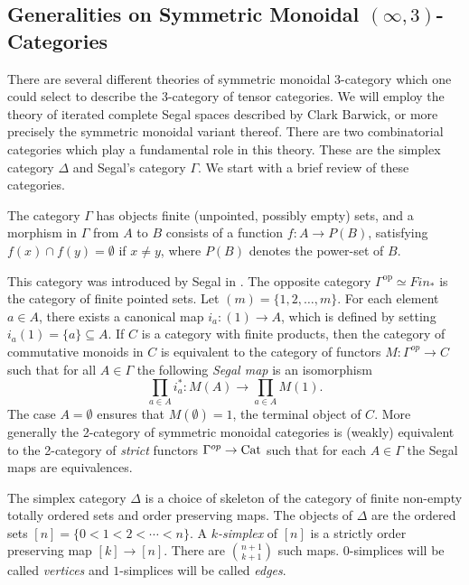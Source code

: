 \documentclass{amsart}
\begin{document}
\subsection{Generalities on Symmetric Monoidal $(\infty,3)$-Categories}

There are several different theories of symmetric monoidal 3-category which one could select to describe the 3-category of tensor categories. We will employ the theory of iterated complete Segal spaces described by Clark Barwick,  or more precisely the symmetric monoidal variant thereof. There are two combinatorial categories which play a fundamental role in this theory. These are the simplex category $\Delta$ and Segal's category $\Gamma$. We start with a brief review of these categories. 

\begin{definition}
	The category  $\Gamma$ has objects finite (unpointed, possibly empty) sets, and a morphism in $\Gamma$ from $A$ to $B$ consists of a function $f: A \to P(B)$, satisfying $f(x) \cap f(y) = \emptyset$ if $x \neq y$, where $P(B)$ denotes the power-set of $B$. 
\end{definition}

This category was introduced by Segal in \cite{Segal-Categories and Cohomology Theories}.  The opposite category $\Gamma^\textrm{op} \simeq Fin_*$ is the category of finite pointed sets. Let $(m) = \{ 1, 2, \dots, m\}$. For each element $a \in A$, there exists a canonical map $i_a: (1) \to A$, which is defined by setting $i_a(1) = \{a\} \subseteq A$. If $C$ is a category with finite products, then the category of commutative monoids in $C$ is equivalent to the category of functors $M:\Gamma^{op} \to C$ such that for all $A\in \Gamma$ the following {\em Segal map} is an isomorphism
\begin{equation*}
	\prod_{a \in A} i_a^*: M(A) \to \prod_{a \in A} M(1).
\end{equation*}
The case $A=\emptyset$ ensures that $M(\emptyset) = 1$, the terminal object of $C$. More generally the 2-category of symmetric monoidal categories is (weakly) equivalent to the 2-category of {\em strict} functors $\Gamma^{op} \to \mathrm{Cat}$ such that for each $A \in \Gamma$ the Segal maps are equivalences. 

\begin{definition}
	The simplex category $\Delta$ is a choice of skeleton of the category of finite non-empty totally ordered sets and order preserving maps. The objects of $\Delta$ are the ordered sets $[n] = \{ 0 < 1 < 2 < \cdots < n\}$. A {\em $k$-simplex} of $[n]$ is a strictly order preserving map $[k] \to [n]$. There are $ {n+1}\choose {k+1}$ such maps. $0$-simplices will be called {\em vertices} and $1$-simplices will be called {\em edges}. 
\end{definition}
\end{document}
